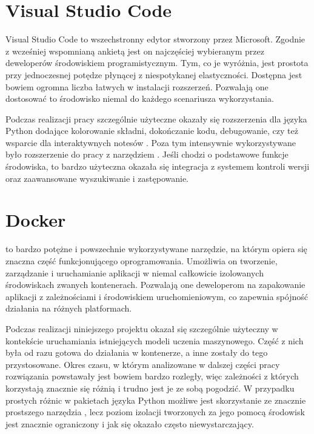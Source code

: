 \section{Visual Studio Code}
Visual Studio Code to wszechstronny edytor stworzony przez Microsoft. Zgodnie z wcześniej wspomnianą ankietą   jest on najczęściej wybieranym przez deweloperów środowiskiem programistycznym. Tym, co je wyróżnia, jest prostota przy jednoczesnej potędze płynącej z niespotykanej elastyczności. Dostępna jest bowiem ogromna liczba łatwych w instalacji rozszerzeń. Pozwalają one dostosować to środowisko niemal do każdego scenariusza wykorzystania.

Podczas realizacji pracy szczególnie użyteczne okazały się rozszerzenia dla języka Python dodające kolorowanie składni, dokończanie kodu, debugowanie, czy też wsparcie dla interaktywnych notesów . Poza tym intensywnie wykorzystywane było rozszerzenie do pracy z narzędziem . Jeśli chodzi o podstawowe funkcje środowiska, to bardzo użyteczna okazała się integracja z systemem kontroli wersji oraz zaawansowane wyszukiwanie i zastępowanie.

\section{Docker}
 to bardzo potężne i powszechnie wykorzystywane narzędzie, na którym opiera się znaczna część funkcjonującego oprogramowania. Umożliwia on tworzenie, zarządzanie i uruchamianie aplikacji w niemal całkowicie izolowanych środowiskach zwanych kontenerach. Pozwalają one deweloperom na zapakowanie aplikacji z zależnościami i środowiskiem uruchomieniowym, co zapewnia spójność działania na różnych platformach.

Podczas realizacji niniejszego projektu  okazał się szczególnie użyteczny w kontekście uruchamiania istniejących modeli uczenia maszynowego. Część z nich była od razu gotowa do działania w kontenerze, a inne zostały do tego przystosowane. Okres czasu, w którym analizowane w dalszej części pracy rozwiązania powstawały jest bowiem bardzo rozległy, więc zależności z których korzystają znacznie się różnią i trudno jest je ze sobą pogodzić. W przypadku prostych różnic w pakietach języka Python możliwe jest skorzystanie ze znacznie prostszego narzędzia , lecz poziom izolacji tworzonych za jego pomocą środowisk jest znacznie ograniczony i jak się okazało często niewystarczający.

